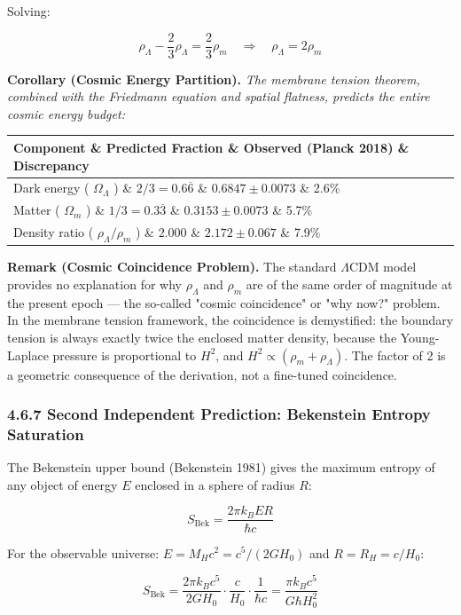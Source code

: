 \documentclass[11pt,a4paper]{article}
\theoremstyle{definition}\newtheorem{definition}{Definition}
\theoremstyle{remark}\newtheorem{remark}{Remark}
\begin{document}
Solving:


\begin{equation}
\rho_\Lambda - \frac{2}{3}\rho_\Lambda = \frac{2}{3}\rho_m \quad \Longrightarrow \quad \boxed{\rho_\Lambda = 2 \rho_m}
\end{equation}


\textbf{Corollary (Cosmic Energy Partition).} \textit{The membrane tension theorem, combined with the Friedmann equation and spatial flatness, predicts the entire cosmic energy budget:}

\begin{longtable}{llll}
\hline
Component \& Predicted Fraction \& Observed (Planck 2018) \& Discrepancy \\
\hline
Dark energy ( $\Omega_\Lambda$ ) \& $2/3 = 0.6\overline{6}$ \& $0.6847 \pm 0.0073$ \& 2.6\% \\
Matter ( $\Omega_m$ ) \& $1/3 = 0.3\overline{3}$ \& $0.3153 \pm 0.0073$ \& 5.7\% \\
Density ratio ( $\rho_\Lambda / \rho_m$ ) \& $2.000$ \& $2.172 \pm 0.067$ \& 7.9\% \\
\hline
\end{longtable}
\textbf{Remark (Cosmic Coincidence Problem).} The standard $\Lambda$CDM model provides no explanation for why $\rho_\Lambda$ and $\rho_m$ are of the same order of magnitude at the present epoch — the so-called "cosmic coincidence" or "why now?" problem. In the membrane tension framework, the coincidence is demystified: the boundary tension is always exactly twice the enclosed matter density, because the Young-Laplace pressure is proportional to $H^2$, and $H^2 \propto (\rho_m + \rho_\Lambda)$. The factor of 2 is a geometric consequence of the derivation, not a fine-tuned coincidence.
\subsubsection{4.6.7 Second Independent Prediction: Bekenstein Entropy Saturation}

The Bekenstein upper bound (Bekenstein 1981) gives the maximum entropy of any object of energy $E$ enclosed in a sphere of radius $R$:


\begin{equation}
S_{\text{Bek}} = \frac{2\pi k_B E R}{\hbar c}
\end{equation}


For the observable universe: $E = M_H c^2 = c^5/(2GH_0)$ and $R = R_H = c/H_0$:


\begin{equation}
S_{\text{Bek}} = \frac{2\pi k_B c^5}{2 G H_0} \cdot \frac{c}{H_0} \cdot \frac{1}{\hbar c} = \frac{\pi k_B c^5}{G \hbar H_0^2}
\end{equation}
\end{document}
